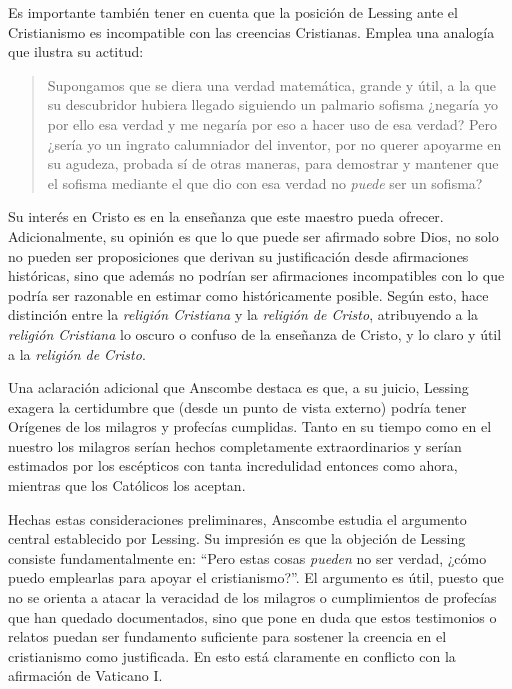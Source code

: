 Es importante también tener en cuenta que la posición de Lessing ante el
Cristianismo es incompatible con las creencias Cristianas. Emplea una analogía
que ilustra su actitud:
\blockquote[{\cite[449]{lessing1982escritos:demo}}]{Supongamos que se diera una
  verdad matemática, grande y útil, a la que su descubridor hubiera llegado
  siguiendo un palmario sofisma \textelp{} ¿negaría yo por ello esa verdad y me
  negaría por eso a hacer uso de esa verdad? Pero ¿sería yo un ingrato
  calumniador del inventor, por no querer apoyarme en su agudeza, probada sí de
  otras maneras, para demostrar y mantener que el sofisma mediante el que dio
  con esa verdad no \emph{puede} ser un sofisma?} Su interés en Cristo es en la
enseñanza que este maestro pueda ofrecer. Adicionalmente, su opinión es que lo
que puede ser afirmado sobre Dios, no solo no pueden ser proposiciones que
derivan su justificación desde afirmaciones históricas, sino que además no
podrían ser afirmaciones incompatibles con lo que podría ser razonable en
estimar como históricamente posible. Según esto, hace distinción entre la
\emph{religión Cristiana} y la \emph{religión de Cristo}, atribuyendo a la
\emph{religión Cristiana} lo oscuro o confuso de la enseñanza de Cristo, y lo
claro y útil a la \emph{religión de Cristo}.

Una aclaración adicional que Anscombe destaca es que, a su juicio, Lessing
exagera la certidumbre que (desde un punto de vista externo) podría tener
Orígenes de los milagros y profecías cumplidas. Tanto en su tiempo como en el
nuestro los milagros serían hechos completamente extraordinarios y serían
estimados por los escépticos con tanta incredulidad entonces como ahora,
mientras que los Católicos los aceptan.

Hechas estas consideraciones preliminares, Anscombe estudia el argumento central
establecido por Lessing. Su impresión es que la objeción de Lessing consiste
fundamentalmente en: \enquote{Pero estas cosas \emph{pueden} no ser verdad,
  ¿cómo puedo emplearlas para apoyar el cristianismo?}. El argumento es útil,
puesto que no se orienta a atacar la veracidad de los milagros o cumplimientos
de profecías que han quedado documentados, sino que pone en duda que estos
testimonios o relatos puedan ser fundamento suficiente para sostener la creencia
en el cristianismo como justificada. En esto está claramente en conflicto con la
afirmación de Vaticano I.

